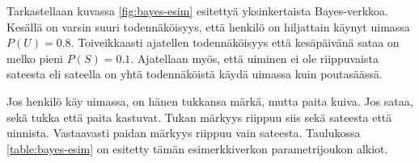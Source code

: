 Tarkastellaan kuvassa \ref{fig:bayes-esim} esitettyä yksinkertaista Bayes-verkkoa. Kesällä on varsin suuri todennäköisyys, että henkilö on hiljattain käynyt uimassa $P(U) = 0.8$. Toiveikkaasti ajatellen todennäköisyys että kesäpäivänä sataa on melko pieni $P(S) = 0.1$. Ajatellaan myös, että uiminen ei ole riippuvaista sateesta eli sateella on yhtä todennäköistä käydä uimassa kuin poutasäässä.

\begin{center}
\end{center}
    
Jos henkilö käy uimassa, on hänen tukkansa märkä, mutta paita kuiva. Jos sataa, sekä tukka että paita kastuvat. Tukan märkyys riippuu siis sekä sateesta että uinnista. Vastaavasti paidan märkyys riippuu vain sateesta. Taulukossa \ref{table:bayes-esim} on esitetty tämän esimerkkiverkon parametrijoukon alkiot.


